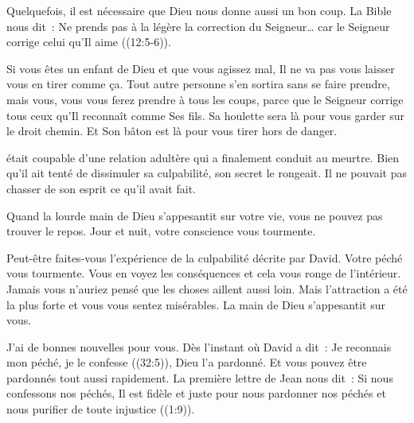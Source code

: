 Quelquefois, il est nécessaire que Dieu nous donne aussi un bon coup.
 La Bible nous dit~:
 \og Ne prends pas à la légère la correction du Seigneur\dots{}
 car le Seigneur corrige celui qu'Il aime \fg{} ((12:5-6)).

Si vous êtes un enfant de Dieu et que vous agissez mal,
 Il ne va pas vous laisser vous en tirer comme ça.
 Tout autre personne s'en sortira sans se faire prendre, mais vous,
 vous vous ferez prendre à tous les coups, parce que le Seigneur
 corrige tous ceux qu'Il reconnaît comme Ses fils.
 Sa houlette sera là pour vous garder sur le droit chemin.
 Et Son bâton est là pour vous tirer hors de danger. 

\dvrule






 était coupable d'une relation adultère
 qui a finalement conduit au meurtre.
 Bien qu'il ait tenté de dissimuler sa culpabilité,
 son secret le rongeait.
 Il ne pouvait pas chasser de son esprit ce qu'il avait fait. 

Quand la lourde main de Dieu s'appesantit sur votre vie,
 vous ne pouvez pas trouver le repos.
 Jour et nuit, votre conscience vous tourmente. 


Peut-être faites-vous l'expérience de la culpabilité décrite par David.
 Votre péché vous tourmente.
 Vous en voyez les conséquences et cela vous ronge de l'intérieur.
 Jamais vous n'auriez pensé que les choses aillent aussi loin.
 Mais l'attraction a été la plus forte et vous vous sentez misérables.
 La main de Dieu s'appesantit sur vous. 

J'ai de bonnes nouvelles pour vous. Dès l'instant où David a dit~:
 \og Je reconnais mon péché, je le confesse \fg{} ((32:5)),
 Dieu l'a pardonné.
 Et vous pouvez être pardonnés tout aussi rapidement.
 La première lettre de Jean nous dit~:
 \og Si nous confessons nos péchés, Il est fidèle et juste
 pour nous pardonner nos péchés et nous purifier de toute injustice \fg{}
 ((1:9)).

